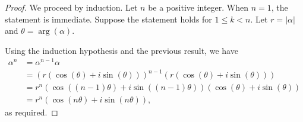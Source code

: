 \documentclass{article}
\begin{document}
\begin{proof} We proceed by induction. Let $n$ be a positive integer. When $n = 1$, the statement is immediate. Suppose the statement holds for $1 \leq k < n$. Let $r = |\alpha|$ and $\theta = \arg(\alpha)$.

Using the induction hypothesis and the previous result, we have \begin{align*}\alpha^n &= \alpha^{n-1} \alpha \\
&= \left(r (\cos(\theta) + i \sin(\theta))\right)^{n-1} \left(r (\cos(\theta) + i \sin(\theta))\right) \\
&= r^n (\cos((n-1)\theta) + i \sin((n-1)\theta)) (\cos(\theta) + i \sin (\theta)) \\
&= r^n (\cos (n\theta) + i \sin(n\theta)),\end{align*}
as required.

\end{proof}
\end{document}
